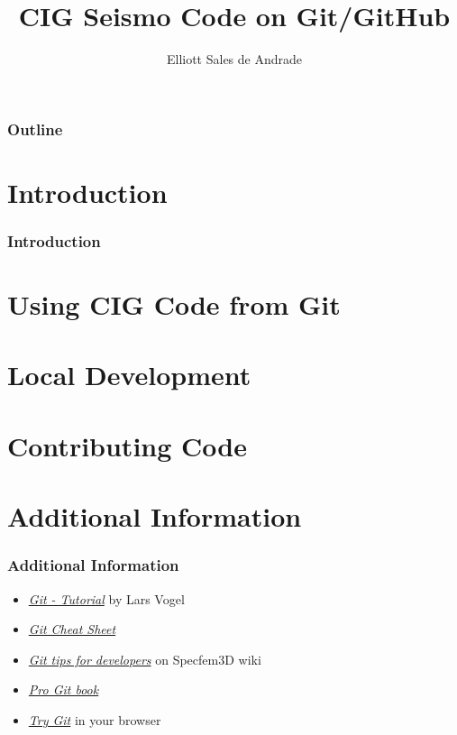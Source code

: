\documentclass{beamer}
\author{Elliott Sales de Andrade}
\title{CIG Seismo Code on Git/GitHub}
\institute{University of Toronto}
\begin{document}
\begin{frame}
 \titlepage
\end{frame}

\begin{frame}
 \frametitle{Outline}
 \tableofcontents
\end{frame}

\section{Introduction}

\begin{frame}
 \frametitle{Introduction}

\end{frame}

\section{Using CIG Code from Git}

\section{Local Development}

\section{Contributing Code}

\section{Additional Information}

\begin{frame}
 \frametitle{Additional Information}

 \begin{itemize}
  \item \href{http://www.vogella.com/tutorials/Git/article.html}{\textit{Git - Tutorial}}
   by Lars Vogel
  \item \href{http://www.git-tower.com/blog/git-cheat-sheet/}{\textit{Git Cheat Sheet}}
  \item \href{https://github.com/geodynamics/specfem3d/wiki/Git-tips-for-developers}{\textit{Git tips for developers}}
   on Specfem3D wiki
  \item \href{http://git-scm.com/book}{\textit{Pro Git book}}
  \item \href{https://try.github.io/levels/1/challenges/1}{\textit{Try Git}}
   in your browser
 \end{itemize}
\end{frame}
\end{document}
